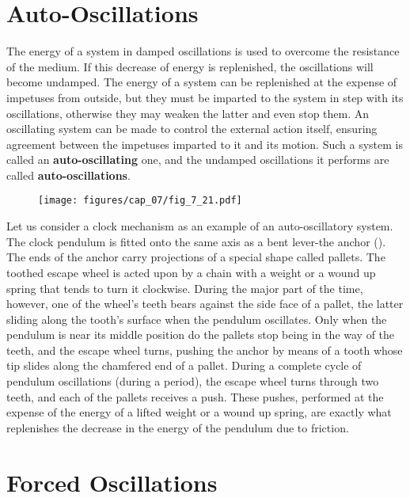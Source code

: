 \section{Auto-Oscillations}\label{sec:7_11}

The energy of a system in damped oscillations is used to overcome the resistance of the medium. If this decrease of energy is replenished, the oscillations will become undamped. The energy of a system can be replenished at the expense of impetuses from outside, but they must be imparted to the system in step with its oscillations, otherwise they may weaken the latter and even stop them. An oscillating system can be made to control the external action itself, ensuring agreement between the impetuses imparted to it and its motion. Such a system is called an \textbf{auto-oscillating} one, and the undamped oscillations it performs are called \textbf{auto-oscillations}.

\begin{figure}[t]
	\begin{center}
		\texttt{[image: figures/cap\_07/fig\_7\_21.pdf]}
		\caption[]{}
		\label{fig:7_21}
	\end{center}
	\vspace{-0.8cm}
\end{figure}

Let us consider a clock mechanism as an example of an auto-oscillatory system. The clock pendulum is fitted onto the same axis as a bent lever-the anchor (). The ends of the anchor carry projections of a special shape called pallets. The toothed escape wheel is acted upon by a chain with a weight or a wound up spring that tends to turn it clockwise. During the major part of the time, however, one of the wheel's teeth bears against the side face of a pallet, the latter sliding along the tooth's surface when the pendulum oscillates. Only when the pendulum is near its middle position do the pallets stop being in the way of the teeth, and the escape wheel turns, pushing the anchor by means of a tooth whose tip slides along the chamfered end of a pallet. During a complete cycle of pendulum oscillations (during a period), the escape wheel turns through two teeth, and each of the pallets receives a push. These pushes, performed at the expense of the energy of a lifted weight or a wound up spring, are exactly what replenishes the decrease in the energy of the pendulum due to friction.

\section{Forced Oscillations}\label{sec:7_12}

